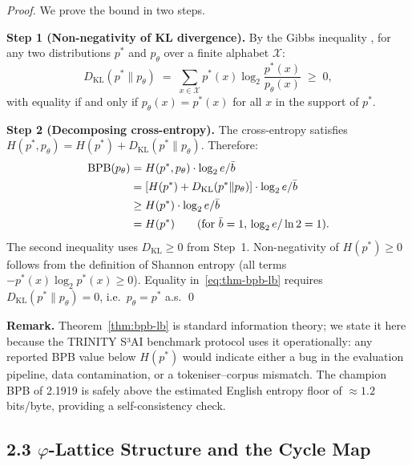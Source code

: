 \begin{proof}
We prove the bound in two steps.

\medskip\noindent\textbf{Step 1 (Non-negativity of KL divergence).}
By the Gibbs inequality \citep{cover_thomas_info}, for any two
distributions $p^*$ and $p_\theta$ over a finite alphabet $\mathcal{X}$:
%
\begin{equation}
  D_{\mathrm{KL}}(p^* \| p_\theta)
  \;=\; \sum_{x \in \mathcal{X}} p^*(x) \log_2\frac{p^*(x)}{p_\theta(x)}
  \;\ge\; 0,
  \label{eq:kl-nonneg}
\end{equation}
%
with equality if and only if $p_\theta(x) = p^*(x)$ for all $x$ in
the support of $p^*$.

\medskip\noindent\textbf{Step 2 (Decomposing cross-entropy).}
The cross-entropy satisfies
$H(p^*, p_\theta) = H(p^*) + D_{\mathrm{KL}}(p^* \| p_\theta)$.
Therefore:
%
\begin{align}
  \mathrm{BPB}(p_\theta)
  &= H(p^*, p_\theta) \cdot \log_2 e / \bar{b}  \notag\\
  &= [H(p^*) + D_{\mathrm{KL}}(p^* \| p_\theta)] \cdot \log_2 e / \bar{b}
     \notag\\
  &\ge H(p^*) \cdot \log_2 e / \bar{b}
     \label{eq:bpb-lb-step2}\\
  &= H(p^*)  \qquad (\text{for } \bar{b}=1,\,\log_2 e / \ln 2 = 1).
     \notag
\end{align}
%
The second inequality uses $D_{\mathrm{KL}} \ge 0$ from Step~1.
Non-negativity of $H(p^*) \ge 0$ follows from the definition of
Shannon entropy (all terms $-p^*(x)\log_2 p^*(x) \ge 0$).
Equality in~\eqref{eq:thm-bpb-lb} requires
$D_{\mathrm{KL}}(p^* \| p_\theta) = 0$, i.e.\ $p_\theta = p^*$ a.s.
\qed
\end{proof}

\medskip\noindent
\textbf{Remark.}
Theorem~\ref{thm:bpb-lb} is standard information theory; we state it
here because the TRINITY S³AI benchmark protocol uses it operationally:
any reported BPB value below $H(p^*)$ would indicate either a bug in
the evaluation pipeline, data contamination, or a tokeniser–corpus
mismatch.  The champion BPB of 2.1919 is safely above the estimated
English entropy floor of $\approx 1.2$ bits/byte, providing a
self-consistency check.


\subsection{2.3 $\varphi$-Lattice Structure and the Cycle Map}
\label{sec:ch25-lattice}

